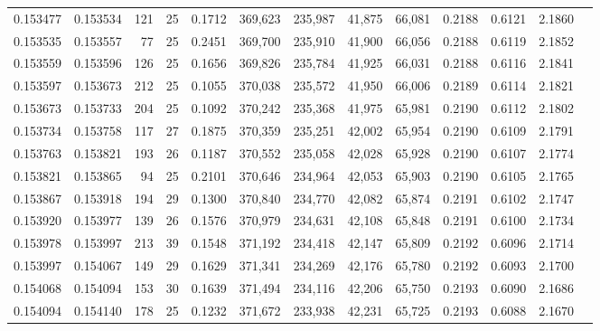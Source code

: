 \begin{tabular}{rrrrrrrrrrrrr}
0.153477 & 0.153534 & 121 &  25 &                                     0.1712 & 369,623 & 235,987 &  41,875 &  66,081 & 0.2188 & 0.6121 & 2.1860 \\
0.153535 & 0.153557 &  77 &  25 &                                     0.2451 & 369,700 & 235,910 &  41,900 &  66,056 & 0.2188 & 0.6119 & 2.1852 \\
0.153559 & 0.153596 & 126 &  25 &                                     0.1656 & 369,826 & 235,784 &  41,925 &  66,031 & 0.2188 & 0.6116 & 2.1841 \\
0.153597 & 0.153673 & 212 &  25 &                                     0.1055 & 370,038 & 235,572 &  41,950 &  66,006 & 0.2189 & 0.6114 & 2.1821 \\
0.153673 & 0.153733 & 204 &  25 &                                     0.1092 & 370,242 & 235,368 &  41,975 &  65,981 & 0.2190 & 0.6112 & 2.1802 \\
0.153734 & 0.153758 & 117 &  27 &                                     0.1875 & 370,359 & 235,251 &  42,002 &  65,954 & 0.2190 & 0.6109 & 2.1791 \\
0.153763 & 0.153821 & 193 &  26 &                                     0.1187 & 370,552 & 235,058 &  42,028 &  65,928 & 0.2190 & 0.6107 & 2.1774 \\
0.153821 & 0.153865 &  94 &  25 &                                     0.2101 & 370,646 & 234,964 &  42,053 &  65,903 & 0.2190 & 0.6105 & 2.1765 \\
0.153867 & 0.153918 & 194 &  29 &                                     0.1300 & 370,840 & 234,770 &  42,082 &  65,874 & 0.2191 & 0.6102 & 2.1747 \\
0.153920 & 0.153977 & 139 &  26 &                                     0.1576 & 370,979 & 234,631 &  42,108 &  65,848 & 0.2191 & 0.6100 & 2.1734 \\
0.153978 & 0.153997 & 213 &  39 &                                     0.1548 & 371,192 & 234,418 &  42,147 &  65,809 & 0.2192 & 0.6096 & 2.1714 \\
0.153997 & 0.154067 & 149 &  29 &                                     0.1629 & 371,341 & 234,269 &  42,176 &  65,780 & 0.2192 & 0.6093 & 2.1700 \\
0.154068 & 0.154094 & 153 &  30 &                                     0.1639 & 371,494 & 234,116 &  42,206 &  65,750 & 0.2193 & 0.6090 & 2.1686 \\
0.154094 & 0.154140 & 178 &  25 &                                     0.1232 & 371,672 & 233,938 &  42,231 &  65,725 & 0.2193 & 0.6088 & 2.1670 \\

\end{tabular}
